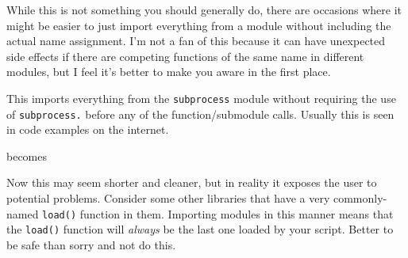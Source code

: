 While this is not something you should generally do, there are occasions
where it might be easier to just import everything from a module without
including the actual name assignment. I'm not a fan of this because it
can have unexpected side effects if there are competing functions of the
same name in different modules, but I feel it's better to make you aware
in the first place.

\begin{Shaded}
\begin{Highlighting}[]
 \OperatorTok{*}
\end{Highlighting}
\end{Shaded}

This imports everything from the \texttt{subprocess} module without
requiring the use of \texttt{subprocess.} before any of the
function/submodule calls. Usually this is seen in code examples on the
internet.

\begin{Shaded}
\begin{Highlighting}[]
\OperatorTok{=}\OperatorTok{=}\OperatorTok{=}\OperatorTok{=}
\end{Highlighting}
\end{Shaded}

becomes

\begin{Shaded}
\begin{Highlighting}[]
 \OperatorTok{*}
\OperatorTok{=}\OperatorTok{=}\OperatorTok{=}\OperatorTok{=}
\end{Highlighting}
\end{Shaded}

Now this may seem shorter and cleaner, but in reality it exposes the
user to potential problems. Consider some other libraries that have a
very commonly-named \texttt{load()} function in them. Importing modules
in this manner means that the \texttt{load()} function will
\emph{always} be the last one loaded by your script. Better to be safe
than sorry and not do this.

